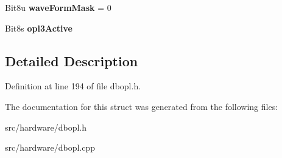 \begin{DoxyCompactItemize}
\item 
\hypertarget{structDBOPL_1_1Chip_a0aa21dbed40c6a7e01e014b841b8c6b0}{Bit8u {\bfseries wave\-Form\-Mask} = 0}\label{structDBOPL_1_1Chip_a0aa21dbed40c6a7e01e014b841b8c6b0}

\item 
\hypertarget{structDBOPL_1_1Chip_a0faef40e4f05cf2d8b789f6da637515d}{Bit8s {\bfseries opl3\-Active}}\label{structDBOPL_1_1Chip_a0faef40e4f05cf2d8b789f6da637515d}

\end{DoxyCompactItemize}


\subsection{Detailed Description}


Definition at line 194 of file dbopl.\-h.



The documentation for this struct was generated from the following files\-:\begin{DoxyCompactItemize}
\item 
src/hardware/dbopl.\-h\item 
src/hardware/dbopl.\-cpp\end{DoxyCompactItemize}
